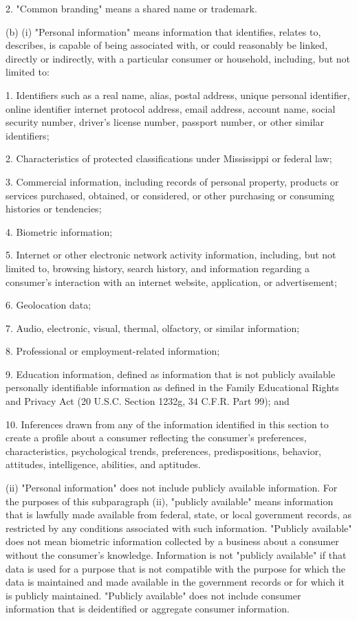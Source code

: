                    2.  "Common branding" means a shared name or trademark.

          (b)  (i)  "Personal information" means information that identifies, relates to, describes, is capable of being associated with, or could reasonably be linked, directly or indirectly, with a particular consumer or household, including, but not limited to:

                   1.  Identifiers such as a real name, alias, postal address, unique personal identifier, online identifier internet protocol address, email address, account name, social security number, driver's license number, passport number, or other similar identifiers;

                   2.  Characteristics of protected classifications under Mississippi or federal law;

                   3.  Commercial information, including records of personal property, products or services purchased, obtained, or considered, or other purchasing or consuming histories or tendencies;

                   4.  Biometric information;

                   5.  Internet or other electronic network activity information, including, but not limited to, browsing history, search history, and information regarding a consumer's interaction with an internet website, application, or advertisement;

                   6.  Geolocation data;

                   7.  Audio, electronic, visual, thermal, olfactory, or similar information;

                   8.  Professional or employment-related information;

                   9.  Education information, defined as information that is not publicly available personally identifiable information as defined in the Family Educational Rights and Privacy Act (20 U.S.C. Section 1232g, 34 C.F.R. Part 99); and

                   10.  Inferences drawn from any of the information identified in this section to create a profile about a consumer reflecting the consumer's preferences, characteristics, psychological trends, preferences, predispositions, behavior, attitudes, intelligence, abilities, and aptitudes.

              (ii)  "Personal information" does not include publicly available information.  For the purposes of this subparagraph (ii), "publicly available" means information that is lawfully made available from federal, state, or local government records, as restricted by any conditions associated with such information.  "Publicly available" does not mean biometric information collected by a business about a consumer without the consumer's knowledge.  Information is not "publicly available" if that data is used for a purpose that is not compatible with the purpose for which the data is maintained and made available in the government records or for which it is publicly maintained.  "Publicly available" does not include consumer information that is deidentified or aggregate consumer information.

